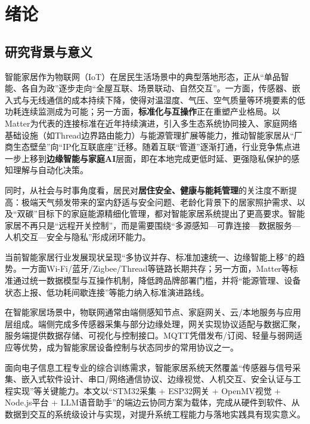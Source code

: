 
\section{绪论}

\subsection{研究背景与意义}
\par 智能家居作为物联网（IoT）在居民生活场景中的典型落地形态，正从“单品智能、各自为政”逐步走向“全屋互联、场景联动、自然交互”。一方面，传感器、嵌入式与无线通信的成本持续下降，使得对温湿度、气压、空气质量等环境要素的低功耗连续监测成为可能；另一方面，\textbf{标准化与互操作}正在重塑产业格局。以Matter为代表的连接标准在近年持续演进，引入多生态系统协同接入、家庭网络基础设施（如Thread边界路由能力）与能源管理扩展等能力，推动智能家居从“厂商生态壁垒”向“IP化互联底座”迁移\cite{csa_matter14}。随着互联“管道”逐渐打通，行业竞争焦点进一步上移到\textbf{边缘智能与家庭AI}层面，即在本地完成更低时延、更强隐私保护的感知理解与自动化决策\cite{eet_matter2026}。
\par 同时，从社会与时事角度看，居民对\textbf{居住安全、健康与能耗管理}的关注度不断提高：极端天气频发带来的室内舒适与安全问题、老龄化背景下的居家照护需求、以及“双碳”目标下的家庭能源精细化管理，都对智能家居系统提出了更高要求。智能家居不再只是“远程开关控制”，而是需要围绕“多源感知—可靠连接—数据服务—人机交互—安全与隐私”形成闭环能力。
\par 当前智能家居行业发展现状呈现“多协议并存、标准加速统一、边缘智能上移”的趋势。一方面Wi-Fi/蓝牙/Zigbee/Thread等链路长期共存；另一方面，Matter等标准通过统一数据模型与互操作机制，降低跨品牌部署门槛，并将“能源管理、设备状态上报、低功耗间歇连接”等能力纳入标准演进路线\cite{csa_matter14}。
\par 在智能家居场景中，物联网通常由端侧感知节点、家庭网关、云/本地服务与应用层组成。端侧完成多传感器采集与部分边缘处理，网关实现协议适配与数据汇聚，服务端提供数据存储、可视化与控制接口。MQTT凭借发布/订阅、轻量与弱网适应等优势，成为智能家居设备控制与状态同步的常用协议之一\cite{mqtt_oasis}。
\par 面向电子信息工程专业的综合训练需求，智能家居系统天然覆盖“传感器与信号采集、嵌入式软件设计、串口/网络通信协议、边缘视觉、人机交互、安全认证与工程实现”等关键能力。本文以“STM32采集 + ESP32网关 + OpenMV视觉 + Node.js平台 + LLM语音助手”的端边云协同方案为载体，完成从硬件到软件、从数据到交互的系统级设计与实现，对提升系统工程能力与落地实践具有现实意义。

